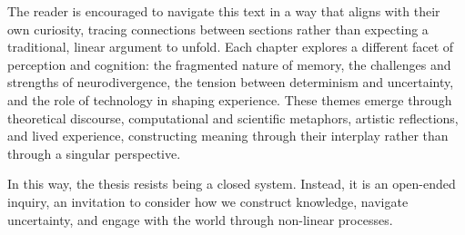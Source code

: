 The reader is encouraged to navigate this text in a way that aligns with their own curiosity, tracing connections between sections rather than expecting a traditional, linear argument to unfold. Each chapter explores a different facet of perception and cognition: the fragmented nature of memory, the challenges and strengths of neurodivergence, the tension between determinism and uncertainty, and the role of technology in shaping experience. These themes emerge through theoretical discourse, computational and scientific metaphors, artistic reflections, and lived experience, constructing meaning through their interplay rather than through a singular perspective.

In this way, the thesis resists being a closed system. Instead, it is an open-ended inquiry, an invitation to consider how we construct knowledge, navigate uncertainty, and engage with the world through non-linear processes.

\footnotesize 
\begin{tcolorbox}[colback=gray!20, colframe=black, arc=2mm, boxrule=0.8pt]
\end{tcolorbox}
\normalsize